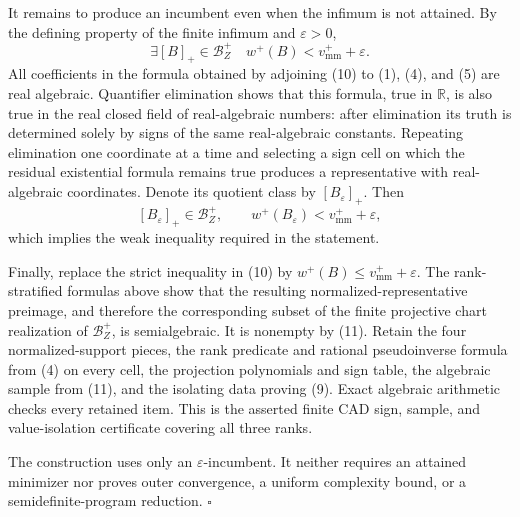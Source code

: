 It remains to produce an incumbent even when the infimum is not attained.  By the defining property of the finite infimum and \(\varepsilon>0\),
\[
\exists [B]_+\in\mathcal B_Z^+
\quad w^+(B)<v_{\mathrm{mm}}^++\varepsilon.
\tag{10}
\]
All coefficients in the formula obtained by adjoining (10) to (1), (4), and (5) are real algebraic.  Quantifier elimination shows that this formula, true in \(\mathbb R\), is also true in the real closed field of real-algebraic numbers: after elimination its truth is determined solely by signs of the same real-algebraic constants.  Repeating elimination one coordinate at a time and selecting a sign cell on which the residual existential formula remains true produces a representative with real-algebraic coordinates.  Denote its quotient class by \([B_\varepsilon]_+\).  Then
\[
[B_\varepsilon]_+\in\mathcal B_Z^+,
\qquad
w^+(B_\varepsilon)<v_{\mathrm{mm}}^++\varepsilon,
\tag{11}
\]
which implies the weak inequality required in the statement.

Finally, replace the strict inequality in (10) by
\(w^+(B)\le v_{\mathrm{mm}}^++\varepsilon\).  The rank-stratified formulas above show that the resulting normalized-representative preimage, and therefore the corresponding subset of the finite projective chart realization of \(\mathcal B_Z^+\), is semialgebraic.  It is nonempty by (11).  Retain the four normalized-support pieces, the rank predicate and rational pseudoinverse formula from (4) on every cell, the projection polynomials and sign table, the algebraic sample from (11), and the isolating data proving (9).  Exact algebraic arithmetic checks every retained item.  This is the asserted finite CAD sign, sample, and value-isolation certificate covering all three ranks.

The construction uses only an \(\varepsilon\)-incumbent.  It neither requires an attained minimizer nor proves outer convergence, a uniform complexity bound, or a semidefinite-program reduction. \(\square\)